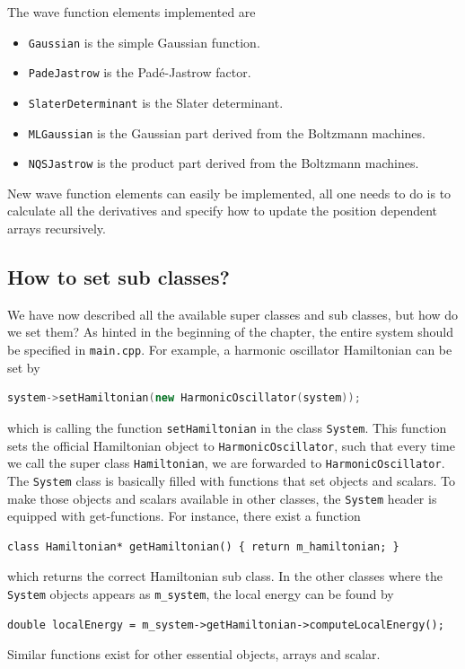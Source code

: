 The wave function elements implemented are 
\begin{itemize}
	\item \texttt{Gaussian} is the simple Gaussian function.
	\item \texttt{PadeJastrow} is the Padé-Jastrow factor.
	\item \texttt{SlaterDeterminant} is the Slater determinant.
	\item \texttt{MLGaussian} is the Gaussian part derived from the Boltzmann machines.
	\item \texttt{NQSJastrow} is the product part derived from the Boltzmann machines. 
\end{itemize}

New wave function elements can easily be implemented, all one needs to do is to calculate all the derivatives and specify how to update the position dependent arrays recursively. 

\subsection{How to set sub classes?}
We have now described all the available super classes and sub classes, but how do we set them? As hinted in the beginning of the chapter, the entire system should be specified in \texttt{main.cpp}. For example, a harmonic oscillator Hamiltonian can be set by
\begin{lstlisting}[language=c++]
system->setHamiltonian(new HarmonicOscillator(system));
\end{lstlisting}
which is calling the function \texttt{setHamiltonian} in the class \texttt{System}. This function sets the official Hamiltonian object to \texttt{HarmonicOscillator}, such that every time we call the super class \texttt{Hamiltonian}, we are forwarded to \texttt{HarmonicOscillator}. The \texttt{System} class is basically filled with functions that set objects and scalars. To make those objects and scalars available in other classes, the \texttt{System} header is equipped with get-functions. For instance, there exist a function 
\lstset{basicstyle=\scriptsize}
\begin{lstlisting}
class Hamiltonian* getHamiltonian() { return m_hamiltonian; }
\end{lstlisting}
which returns the correct Hamiltonian sub class. In the other classes where the \texttt{System} objects appears as \texttt{m\_system}, the local energy can be found by
\lstset{basicstyle=\scriptsize}
\begin{lstlisting}
double localEnergy = m_system->getHamiltonian->computeLocalEnergy();
\end{lstlisting}
Similar functions exist for other essential objects, arrays and scalar. 

